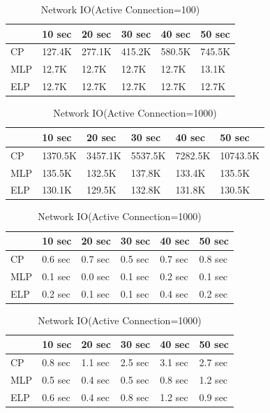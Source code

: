 \begin{table}
\centering \caption{\label{tb:traffic} Network IO(Active Connection=100)}
\begin{tabular}{|l|l|l|l|l|l|}
    \hline      & 10 sec & 20 sec & 30 sec & 40 sec & 50 sec \\
    \hline CP & 127.4K & 277.1K & 415.2K & 580.5K & 745.5K \\
    \hline MLP & 12.7K & 12.7K & 12.7K & 12.7K & 13.1K \\
    \hline ELP & 12.7K & 12.7K & 12.7K & 12.7K & 12.7K \\
    \hline
\end{tabular}
\end{table}

\begin{table}
\centering \caption{\label{tb:traffic} Network IO(Active Connection=1000)}
\begin{tabular}{|l|l|l|l|l|l|}
    \hline & 10 sec & 20 sec & 30 sec & 40 sec & 50 sec \\
    \hline CP & 1370.5K & 3457.1K & 5537.5K & 7282.5K & 10743.5K \\
    \hline MLP & 135.5K & 132.5K & 137.8K & 133.4K & 135.5K \\
    \hline ELP & 130.1K & 129.5K & 132.8K & 131.8K & 130.5K \\
    \hline
\end{tabular}
\end{table}

\begin{table}
\centering \caption{\label{tb:traffic} Network IO(Active Connection=1000)}
\begin{tabular}{|l|l|l|l|l|l|}
    \hline & 10 sec & 20 sec & 30 sec & 40 sec & 50 sec \\
    \hline CP & 0.6 sec & 0.7 sec & 0.5 sec & 0.7 sec & 0.8 sec \\
    \hline MLP & 0.1 sec & 0.0 sec & 0.1 sec & 0.2 sec & 0.1 sec \\
    \hline ELP & 0.2 sec & 0.1 sec & 0.1 sec & 0.4 sec & 0.2 sec \\
    \hline
\end{tabular}
\end{table}

\begin{table}
\centering \caption{\label{tb:traffic} Network IO(Active Connection=1000)}
\begin{tabular}{|l|l|l|l|l|l|}
    \hline & 10 sec & 20 sec & 30 sec & 40 sec & 50 sec \\
    \hline CP & 0.8 sec & 1.1 sec & 2.5 sec & 3.1 sec & 2.7 sec \\
    \hline MLP & 0.5 sec & 0.4 sec & 0.5 sec & 0.8 sec & 1.2 sec \\
    \hline ELP & 0.6 sec & 0.4 sec & 0.8 sec & 1.2 sec & 0.9 sec \\
    \hline
\end{tabular}
\end{table}

